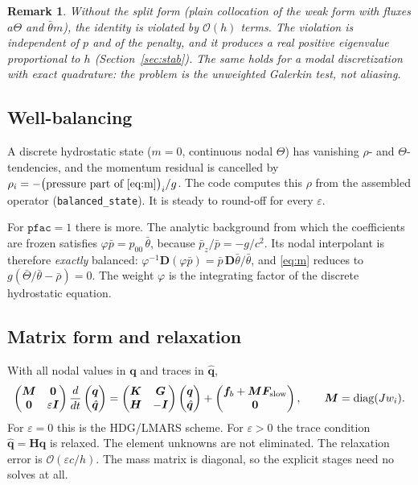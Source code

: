 \documentclass[11pt,a4paper]{article}
\newtheorem{remark}{Remark}
\newcommand{\qh}{\hat{\bm q}}
\newcommand{\q}{\bm q}
\newcommand{\thb}{\bar\theta}
\newcommand{\D}{\bm D}
\begin{document}
\begin{remark}
Without the split form (plain collocation of the weak form with fluxes $a\Theta$ and $\thb m$),
the identity is violated by $\mathcal O(h)$ terms. The violation is independent of $p$ and of
the penalty, and it produces a real positive eigenvalue proportional to $h$
(Section~\ref{sec:stab}). The same holds for a modal discretization with exact quadrature: the
problem is the unweighted Galerkin test, not aliasing.
\end{remark}

\subsection{Well-balancing}
A discrete hydrostatic state ($m=0$, continuous nodal $\Theta$) has vanishing $\rho$- and
$\Theta$-tendencies, and the momentum residual is cancelled by
$\rho_i=-\big(\text{pressure part of \eqref{eq:m}}\big)_i/g$. The code computes this $\rho$ from
the assembled operator (\texttt{balanced\_state}). It is steady to round-off for every
$\varepsilon$.

For $\texttt{pfac}=1$ there is more. The analytic background from which the coefficients are
frozen satisfies $\varphi\bar p=p_{00}\,\thb$, because $\bar p_z/\bar p=-g/c^2$. Its nodal
interpolant is therefore \emph{exactly} balanced: $\varphi^{-1}\D(\varphi\bar p)=\bar p\,\D\thb/\thb$,
and \eqref{eq:m} reduces to $g(\bar\Theta/\thb-\bar\rho)=0$. The weight $\varphi$ is the
integrating factor of the discrete hydrostatic equation.

\subsection{Matrix form and relaxation}
With all nodal values in $\q$ and traces in $\qh$,
\begin{equation}\label{eq:relax}
\begin{pmatrix}\bm M&\bm 0\\\bm 0&\varepsilon\bm I\end{pmatrix}
\frac{d}{dt}\begin{pmatrix}\q\\\qh\end{pmatrix}
=\begin{pmatrix}\bm K&\bm G\\\bm H&-\bm I\end{pmatrix}
\begin{pmatrix}\q\\\qh\end{pmatrix}
+\begin{pmatrix}\bm f_b+\bm M\bm F_{\rm slow}\\\bm 0\end{pmatrix},
\qquad \bm M=\operatorname{diag}(J w_i).
\end{equation}
For $\varepsilon=0$ this is the HDG/LMARS scheme. For $\varepsilon>0$ the trace condition
$\qh=\bm H\q$ is relaxed. The element unknowns are not eliminated. The relaxation error is
$\mathcal O(\varepsilon c/h)$. The mass matrix is diagonal, so the explicit stages need no
solves at all.
\end{document}
